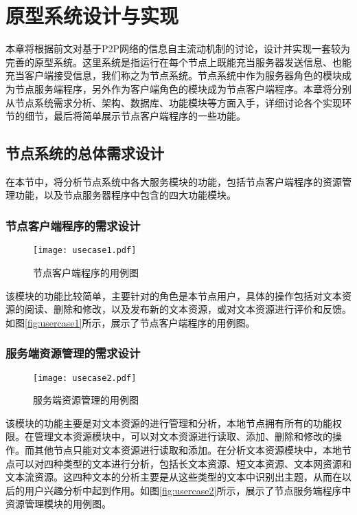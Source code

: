 \section{原型系统设计与实现}
本章将根据前文对基于P2P网络的信息自主流动机制的讨论，设计并实现一套较为完善的原型系统。这里系统是指运行在每个节点上既能充当服务器发送信息、也能充当客户端接受信息，我们称之为节点系统。节点系统中作为服务器角色的模块成为节点服务端程序，另外作为客户端角色的模块成为节点客户端程序。本章将分别从节点系统需求分析、架构、数据库、功能模块等方面入手，详细讨论各个实现环节的细节，最后将简单展示节点客户端程序的一些功能。

\subsection{节点系统的总体需求设计}
在本节中，将分析节点系统中各大服务模块的功能，包括节点客户端程序的资源管理功能，以及节点服务器程序中包含的四大功能模块。

\subsubsection{节点客户端程序的需求设计}
\begin{figure}[!ht]
\centering
\texttt{[image: usecase1.pdf]}
\caption{节点客户端程序的用例图}
\label{fig:usecase1}
\end{figure}

该模块的功能比较简单，主要针对的角色是本节点用户，具体的操作包括对文本资源的阅读、删除和修改，以及发布新的文本资源，或对文本资源进行评价和反馈。如图\ref{fig:usercase1}所示，展示了节点客户端程序的用例图。

\subsubsection{服务端资源管理的需求设计}
\begin{figure}[!ht]
\centering
\texttt{[image: usecase2.pdf]}
\caption{服务端资源管理的用例图}
\label{fig:usecase2}
\end{figure}

该模块的功能主要是对文本资源的进行管理和分析，本地节点拥有所有的功能权限。在管理文本资源模块中，可以对文本资源进行读取、添加、删除和修改的操作。而其他节点只能对文本资源进行读取和添加。在分析文本资源模块中，本地节点可以对四种类型的文本进行分析，包括长文本资源、短文本资源、文本网资源和文本流资源。这四种文本的分析主要是从这些类型的文本中识别出主题，从而在以后的用户兴趣分析中起到作用。如图\ref{fig:usercase2}所示，展示了节点服务端程序中资源管理模块的用例图。

